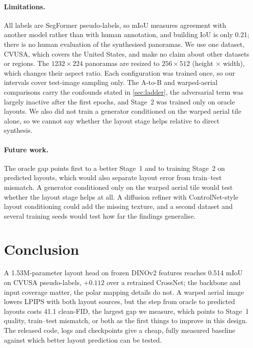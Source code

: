 \documentclass[11pt]{article}
\begin{document}
\paragraph{Limitations.} All labels are SegFormer pseudo-labels, so mIoU measures agreement with another model
rather than with human annotation, and building IoU is only 0.21; there is no human evaluation of the
synthesised panoramas. We use one dataset, CVUSA, which covers the United States, and make no claim about
other datasets or regions. The $1232\times224$ panoramas are resized to $256\times512$ (height $\times$ width),
which changes their aspect ratio. Each configuration was trained once, so our intervals cover test-image
sampling only. The A-to-B and warped-aerial comparisons carry the confounds stated in \cref{sec:ladder}, the
adversarial term was largely inactive after the first epochs, and Stage~2 was trained only on oracle layouts.
We also did not train a generator conditioned on the warped aerial tile alone, so we cannot say whether the
layout stage helps relative to direct synthesis.

\paragraph{Future work.} The oracle gap points first to a better Stage~1 and to training Stage~2 on predicted
layouts, which would also separate layout error from train--test mismatch. A generator conditioned only on the
warped aerial tile would test whether the layout stage helps at all. A diffusion refiner with
ControlNet-style layout conditioning \cite{zhang2023controlnet} could add the missing texture, and a second
dataset and several training seeds would test how far the findings generalise.

\FloatBarrier
\section{Conclusion}
\label{sec:conclusion}

A 1.53M-parameter layout head on frozen DINOv2 features reaches 0.514 mIoU on CVUSA pseudo-labels, $+0.112$ over
a retrained CrossNet; the backbone and input coverage matter, the polar mapping details do not. A warped
aerial image lowers LPIPS with both layout sources, but the step from oracle to predicted layouts costs 41.1
clean-FID, the largest gap we measure, which points to Stage~1 quality, train--test mismatch, or both as the
first things to improve in this design. The released code, logs and checkpoints give a cheap, fully measured
baseline against which better layout prediction can be tested.
\label{endofmain}
\end{document}
